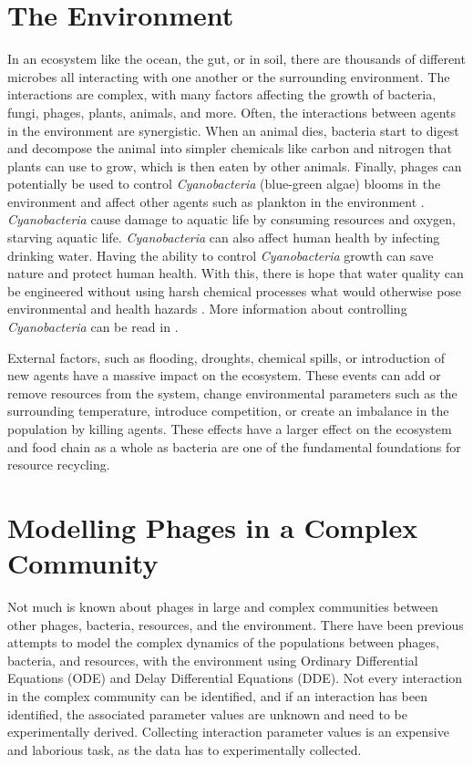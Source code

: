 \section{The Environment}
In an ecosystem like the ocean, the gut, or in soil, there are thousands of different microbes all interacting with one another or the surrounding environment.
The interactions are complex, with many factors affecting the growth of bacteria, fungi, phages, plants, animals, and more. 
Often, the interactions between agents in the environment are synergistic. 
When an animal dies, bacteria start to digest and decompose the animal into simpler chemicals like carbon and nitrogen that plants can use to grow, which is then eaten by other animals. 
Finally, phages can potentially be used to control \textit{Cyanobacteria} (blue-green algae) blooms in the environment and affect other agents such as plankton in the environment \cite{colomaFrequencyVirusresistantHosts2019}. 
\textit{Cyanobacteria} cause damage to aquatic life by consuming resources and oxygen, starving aquatic life. \textit{Cyanobacteria} can also affect human health by infecting drinking water. 
Having the ability to control \textit{Cyanobacteria} growth can save nature and protect human health. 
With this, there is hope that water quality can be engineered without using harsh chemical processes what would otherwise pose environmental and health hazards \cite{tuckerIdentificationCyanophageMaLBP2005}. \newline
More information about controlling \textit{Cyanobacteria} can be read in . 

External factors, such as flooding, droughts, chemical spills, or introduction of new agents have a massive impact on the ecosystem. 
These events can add or remove resources from the system, change environmental parameters such as the surrounding temperature, introduce competition, or create an imbalance in the population by killing agents. 
These effects have a larger effect on the ecosystem and food chain as a whole as bacteria are one of the fundamental foundations for resource recycling. 

\section{Modelling Phages in a Complex Community}
Not much is known about phages in large and complex communities between other phages, bacteria, resources, and the environment. 
There have been previous attempts to model the complex dynamics of the populations between phages, bacteria, and resources, with the environment using Ordinary Differential Equations (ODE) and Delay Differential Equations (DDE).
Not every interaction in the complex community can be identified, and if an interaction has been identified, the associated parameter values are unknown and need to be experimentally derived. 
Collecting interaction parameter values is an expensive and laborious task, as the data has to experimentally collected. 

